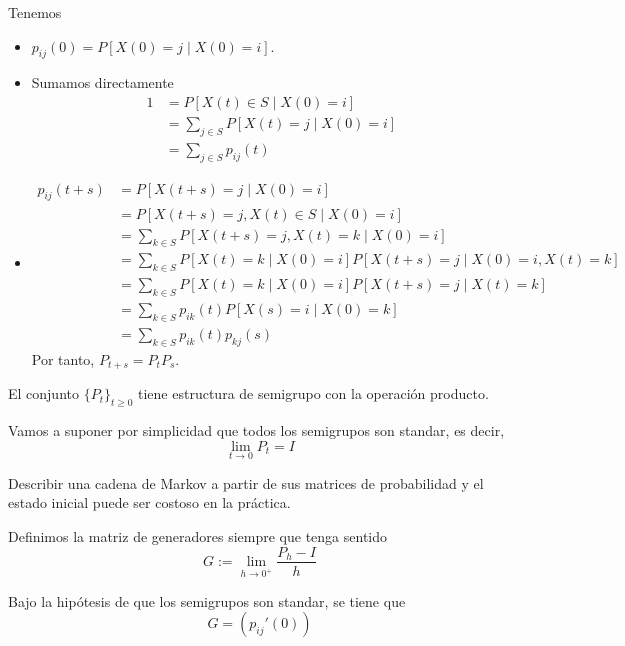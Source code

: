 \documentclass[PREyA.tex]{subfiles}
\begin{document}
\begin{dem} Tenemos
\begin{itemize}
\item $p_{ij}(0) = P[X(0)=j\mid X(0)=i]$.
\item Sumamos directamente
\begin{align*}
1 &= P[X(t)\in S \mid X(0)=i] \\
&= \sum_{j \in S} P[X(t)=j \mid X(0)=i]\\
&=\sum_{j\in S} p_{ij}(t)
\end{align*}
\item 
\begin{align*}
p_{ij}(t+s) &= P[X(t+s) =j \mid X(0)=i]\\
& = P[X(t+s)=j, X(t)\in S \mid X(0)=i]\\
&=\sum_{k \in S} P[X(t+s)=j, X(t)=k \mid X(0)=i]\\
&=\sum_{k\in S} P[X(t) = k  \mid X(0)=i] P[X(t+s) = j \mid X(0)=i, X(t)=k]\\
&=\sum_{k\in S} P[X(t) = k  \mid X(0)=i] P[X(t+s) = j \mid  X(t)=k]\\
&=\sum_{k\in S} p_{ik}(t) P[X(s) = i \mid  X(0)=k]\\
&=\sum_{k\in S} p_{ik}(t) p_{kj}(s) 
\end{align*}
Por tanto, $P_{t+s} = P_t P_s$.
\end{itemize}

\end{dem}
\begin{prop}
El conjunto $\{P_t\}_{t\geq 0}$ tiene estructura de semigrupo con la operación producto.
\end{prop}
\begin{nota}
Vamos a suponer por simplicidad que todos los semigrupos son standar, es decir, 
$$
\lim_{t\to0} P_t = I
$$
\end{nota}

\begin{nota}
Describir una cadena de Markov a partir de sus matrices de probabilidad y el estado inicial puede ser costoso en la práctica.
\end{nota}
\begin{defi}
Definimos la matriz de generadores siempre que tenga sentido
$$
G:= \lim_{h\to 0^+} \frac{P_h -I }{h} 
$$
\end{defi}
\begin{prop}
Bajo la hipótesis de que los semigrupos son standar, se tiene que
$$
G= (p_{ij}'(0))
$$
\end{prop}
\end{document}
